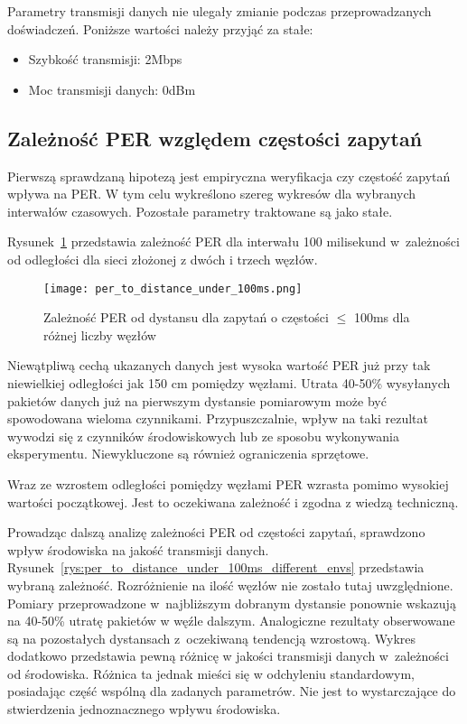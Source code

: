 Parametry transmisji danych nie ulegały zmianie podczas przeprowadzanych doświadczeń. Poniższe wartości należy
przyjąć za stałe:
\begin{itemize}
\item Szybkość transmisji: 2Mbps
\item Moc transmisji danych: 0dBm
\end{itemize}

\subsection{Zależność PER względem częstości zapytań}

Pierwszą sprawdzaną hipotezą jest empiryczna weryfikacja czy częstość zapytań wpływa na \gls{PER}.
W tym celu wykreślono szereg wykresów dla wybranych interwałów czasowych. Pozostałe parametry traktowane są
jako stałe.

Rysunek~\ref{rys:per_to_distance_under_100ms} przedstawia zależność PER dla interwału 100 milisekund w~zależności
od odległości dla sieci złożonej z dwóch i trzech węzłów. 

\begin{figure}[!htb]
	\centering \texttt{[image: per\_to\_distance\_under\_100ms.png]}
	\caption{Zależność \gls{PER} od dystansu dla zapytań o częstości $\leqslant$ 100ms dla różnej liczby węzłów}
	\label{rys:per_to_distance_under_100ms}
\end{figure}

Niewątpliwą cechą ukazanych danych jest wysoka wartość PER już przy tak niewielkiej odległości jak 150 cm pomiędzy węzłami.
Utrata 40-50\% wysyłanych pakietów danych już na pierwszym dystansie pomiarowym może być spowodowana wieloma czynnikami.
Przypuszczalnie, wpływ na taki rezultat wywodzi się z czynników środowiskowych lub ze sposobu wykonywania 
eksperymentu. Niewykluczone są również ograniczenia sprzętowe.

Wraz ze wzrostem odległości pomiędzy węzłami PER wzrasta pomimo wysokiej wartości początkowej. Jest to 
oczekiwana zależność i zgodna z wiedzą techniczną.

Prowadząc dalszą analizę zależności PER od częstości zapytań, sprawdzono wpływ środowiska na jakość transmisji danych.
Rysunek~\ref{rys:per_to_distance_under_100ms_different_envs} przedstawia wybraną zależność. Rozróżnienie
na ilość węzłów nie zostało tutaj uwzględnione. Pomiary przeprowadzone w~najbliższym dobranym dystansie ponownie 
wskazują na 40-50\% utratę pakietów w węźle dalszym. Analogiczne rezultaty obserwowane są na pozostałych dystansach 
z~oczekiwaną tendencją wzrostową.
Wykres dodatkowo przedstawia pewną różnicę w jakości transmisji danych w~zależności od środowiska. Różnica ta 
jednak mieści się w odchyleniu standardowym, posiadając część wspólną dla zadanych parametrów. Nie jest to 
wystarczające do stwierdzenia jednoznacznego wpływu środowiska.


